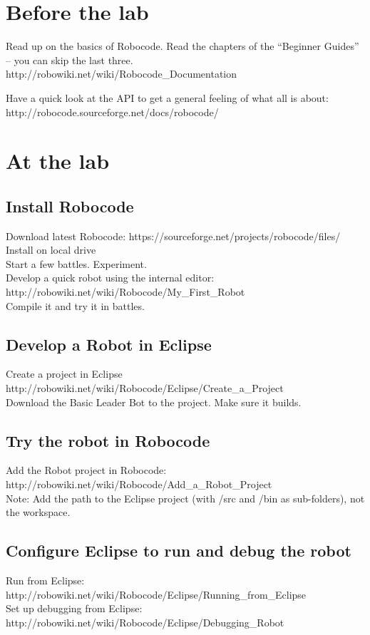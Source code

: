 \documentclass{scrreprt}
\begin{document}
\chapter{Before the lab}
Read up on the basics of Robocode. Read the chapters of the ``Beginner Guides'' -- you can skip the last three.\\
http://robowiki.net/wiki/Robocode\_Documentation

Have a quick look at the API to get a general feeling of what all is about:\\ 
http://robocode.sourceforge.net/docs/robocode/

\chapter{At the lab}

\section{Install Robocode}
Download latest Robocode: https://sourceforge.net/projects/robocode/files/\\
Install on local drive\\
Start a few battles. Experiment.\\
Develop a quick robot using the internal editor: http://robowiki.net/wiki/Robocode/My_First_Robot\\
Compile it and try it in battles.

\section{Develop a Robot in Eclipse} \label{sec:develop}
Create a project in Eclipse http://robowiki.net/wiki/Robocode/Eclipse/Create_a_Project\\
Download the Basic Leader Bot to the project. Make sure it builds.

\section{Try the robot in Robocode} \label{sec:try}
Add the Robot project in Robocode: http://robowiki.net/wiki/Robocode/Add_a_Robot_Project\\
Note: Add the path to the Eclipse project (with /src and /bin as sub-folders), not the workspace.

\section{Configure Eclipse to run and debug the robot}
Run from Eclipse: http://robowiki.net/wiki/Robocode/Eclipse/Running_from_Eclipse\\
Set up debugging from Eclipse: http://robowiki.net/wiki/Robocode/Eclipse/Debugging_Robot
\end{document}
